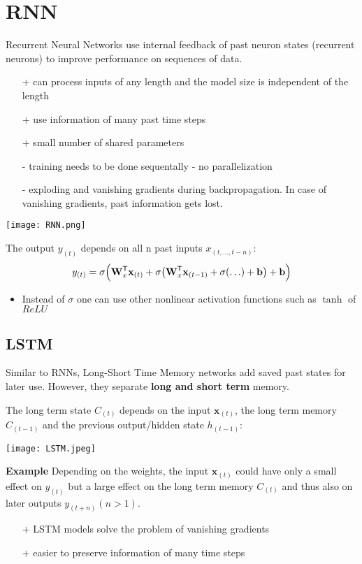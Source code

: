 \section{RNN}\label{sec:RNN} 
Recurrent Neural Networks use internal feedback of past neuron states (recurrent neurons) to improve performance on sequences of data.
\begin{itemize}
    \item[+] can process inputs of any length and the model size is independent of the length
    \item[+] use information of many past time steps
    \item[+] small number of shared parameters
    \item[-] training needs to be done sequentally - no parallelization
    \item[-] exploding and vanishing gradients during backpropagation. In case of vanishing gradients, past information gets lost.
\end{itemize}
\newpar{}
\begin{center}
    \texttt{[image: RNN.png]}
\end{center}
The output $y_{(t)}$ depends on all n past inputs $x_{(t,\ldots,t-n)}$:
\noindent\begin{equation*}
    y_{(t)} = \sigma\Bigl(\mathbf{W}_x^{\mathsf{T}}\mathbf{x}_{(t)} + \sigma\bigl(\mathbf{W}_x^{\mathsf{T}}\mathbf{x}_{(t-1)} + \sigma( \ldots ) + \mathbf{b}\bigr) + \mathbf{b}\Bigr)
\end{equation*}

\newpar{}
\begin{itemize}
    \item Instead of $\sigma$ one can use other nonlinear activation functions such as $\tanh$ of $ReLU$
\end{itemize}


\subsection{LSTM}
Similar to RNNs, Long-Short Time Memory networks add saved past states for later use. However, they separate \textbf{long and short term} memory.

The long term state $C_{(t)}$ depends on the input $\mathbf{x}_{(t)}$, the long term memory $C_{(t-1)}$ and the previous output/hidden state $h_{(t-1)}$:
\begin{center}
    \texttt{[image: LSTM.jpeg]}
\end{center}

\textbf{Example}
Depending on the weights, the input $\mathbf{x}_{(t)}$ could have only a small effect on $y_{(t)}$ but a large effect on the long term memory $C_{(t)}$ and thus also on later outputs $y_{(t+n)} (n>1)$.

\newpar{}
\begin{itemize}
    \item [+] LSTM models solve the problem of vanishing gradients
    \item [+] easier to preserve information of many time steps
\end{itemize}

